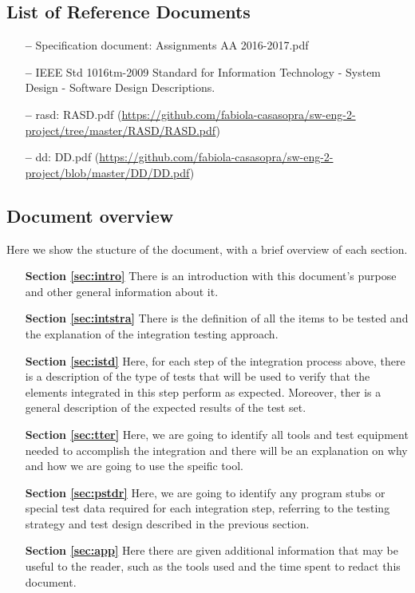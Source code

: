 \subsection{List of Reference Documents}

\begin{itemize}
\item[\textbf{--}] Specification document: Assignments AA 2016-2017.pdf
\item[\textbf{--}] IEEE Std 1016tm-2009 Standard for Information Technology - System Design - Software Design Descriptions.
\item[\textbf{--}] \acl{rasd}: RASD.pdf 
\newline
(\url{https://github.com/fabiola-casasopra/sw-eng-2-project/tree/master/RASD/RASD.pdf})
\item[\textbf{--}] \acl{dd}: DD.pdf 
\newline
(\url{https://github.com/fabiola-casasopra/sw-eng-2-project/blob/master/DD/DD.pdf})
\end{itemize}

\subsection{Document overview}

Here we show the stucture of the document, with a brief overview of each section.

\begin{itemize}

\item[\textbf{Section \ref{sec:intro}}]There is an introduction with this document's purpose and other general information about it.

\item[\textbf{Section \ref{sec:intstra}}]There is the definition of all the items to be tested and the explanation of the integration testing approach.

\item[\textbf{Section \ref{sec:istd}}]Here, for each step of the integration process above, there is a description of the type of tests that will be used to verify that the elements integrated in this step perform as expected. Moreover, ther is a general description of the expected results of the test set.  

\item[\textbf{Section \ref{sec:tter}}]Here, we are going to identify all tools and test equipment needed to accomplish the integration and there will be an explanation on why and how we are going to use the speific tool. 

\item[\textbf{Section \ref{sec:pstdr}}]Here, we are going to identify any program stubs or special test data required for each integration step, referring to the testing strategy and test design described in the previous section.

\item[\textbf{Section \ref{sec:app}}]Here there are given additional information that may be useful to the reader, such as the tools used and the time spent to redact this document.
\end{itemize}